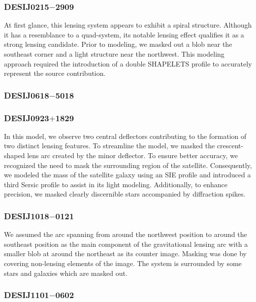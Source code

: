 \documentclass{aa}
\begin{document}
\subsubsection{DESIJ0215$-$2909}

At first glance, this lensing system appears to exhibit a spiral structure. Although it has a resemblance to a quad-system, its notable lensing effect qualifies it as a strong lensing candidate. Prior to modeling, we masked out a blob near the southeast corner and a light structure near the northwest. This modeling approach required the introduction of a double SHAPELETS profile to accurately represent the source contribution.

\subsubsection{DESIJ0618$-$5018}


\subsubsection{DESIJ0923$+$1829}
In this model, we observe two central deflectors contributing to the formation of two distinct lensing features. To streamline the model, we masked the crescent-shaped lens arc created by the minor deflector. To ensure better accuracy, we recognized the need to mask the surrounding region of the satellite. Consequently, we modeled the mass of the satellite galaxy using an SIE profile and introduced a third Sersic profile to assist in its light modeling. Additionally, to enhance precision, we masked clearly discernible stars accompanied by diffraction spikes.

\subsubsection{DESIJ1018$-$0121}

We assumed the arc spanning from around the northwest position to around the southeast position as the main component of the gravitational lensing arc with a smaller blob at around the northeast as its counter image. Masking was done by covering non-lensing elements of the image. The system is surrounded by some stars and galaxies which are masked out.


\subsubsection{DESIJ1101$-$0602}
\end{document}
